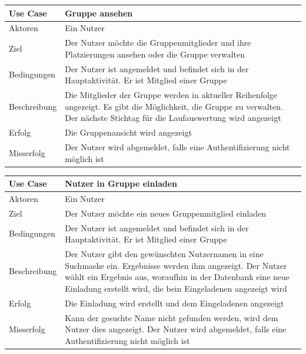 \begin{tabular}{|p{}|p{}|}
\hline
\textbf{Use Case} & \textbf{Gruppe ansehen} \\ \hline
Aktoren &  Ein Nutzer \\ \hline
Ziel &  Der Nutzer möchte die Gruppenmitglieder und ihre Platzierungen ansehen oder die Gruppe verwalten \\ \hline
Bedingungen &  Der Nutzer ist angemeldet und befindet sich in der Hauptaktivität. Er ist Mitglied einer Gruppe \\ \hline
Beschreibung & Die Mitglieder der Gruppe werden in aktueller Reihenfolge angezeigt. Es gibt die Möglichkeit, die Gruppe zu verwalten. Der nächste Stichtag für die Laufauswertung wird angezeigt \\ \hline
Erfolg & Die Gruppenansicht wird angezeigt \\ \hline
Misserfolg & Der Nutzer wird abgemeldet, falls eine Authentifizierung nicht möglich ist \\ \hline
\hline \end{tabular}
\begin{tabular}{|p{}|p{}|}
\hline
\textbf{Use Case} & \textbf{Nutzer in Gruppe einladen} \\ \hline
Aktoren &  Ein Nutzer \\ \hline
Ziel &  Der Nutzer möchte ein neues Gruppenmitglied einladen \\ \hline
Bedingungen &  Der Nutzer ist angemeldet und befindet sich in der Hauptaktivität. Er ist Mitglied einer Gruppe \\ \hline
Beschreibung & Der Nutzer gibt den gewünschten Nutzernamen in eine Suchmaske ein. Ergebnisse werden ihm angezeigt. Der Nutzer wählt ein Ergebnis aus, woraufhin in der Datenbank eine neue Einladung erstellt wird, die bein Eingeladenen angezeigt wird \\ \hline
Erfolg & Die Einladung wird erstellt und dem Eingeladenen angezeigt \\ \hline
Misserfolg & Kann der gesuchte Name nicht gefunden werden, wird dem Nutzer dies angezeigt. Der Nutzer wird abgemeldet, falls eine Authentifizierung nicht möglich ist \\ \hline
\hline \end{tabular}
